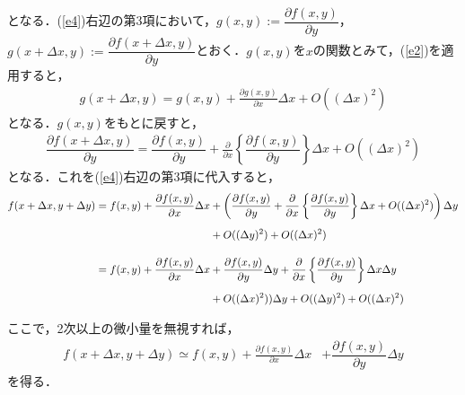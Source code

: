 \documentclass[12pt]{jsarticle}\usepackage{ifthen}\newboolean{enlarge}\setboolean{enlarge}{false}
\begin{document}
となる．(\ref{e4})右辺の第3項において，$g(x,y):=\dfrac{\partial f(x,y)}{\partial y}$，$g(x+\Delta x,y):=\dfrac{\partial f(x+\Delta x,y)}{\partial y}$とおく．$g(x,y)$を$x$の関数とみて，(\ref{e2})を適用すると，
\begin{align}
\label{e5}
g(x+\Delta x,y)=g(x,y)+\frac{\partial g(x,y)}{\partial x}\Delta x+O((\Delta x)^2)
\end{align}
となる．$g(x,y)$をもとに戻すと，
\begin{align}
\label{e6}
\dfrac{\partial f(x+\Delta x,y)}{\partial y}=\dfrac{\partial f(x,y)}{\partial y}+\frac{\partial }{\partial x}
\left\{
\dfrac{\partial f(x,y)}{\partial y}
\right\}
\Delta x+O((\Delta x)^2)
\end{align}
となる．これを(\ref{e4})右辺の第3項に代入すると，
\begin{align}\label{e7}
f(x+\Delta x,y+\Delta y)
=f(x,y)+\frac{\partial f(x,y)}{\partial x}\Delta x&+
\left(\dfrac{\partial f(x,y)}{\partial y}+\frac{\partial }{\partial x}
\left\{
\dfrac{\partial f(x,y)}{\partial y}
\right\}
\Delta x+O((\Delta x)^2)\right)
\Delta y\notag\\[5pt]
&+O((\Delta y)^2)+O((\Delta x)^2)\notag\\[10pt]
%
=f(x,y)+\frac{\partial f(x,y)}{\partial x}\Delta x&+\dfrac{\partial f(x,y)}{\partial y}\Delta y+\frac{\partial }{\partial x}
\left\{
\dfrac{\partial f(x,y)}{\partial y}
\right\}\Delta x\Delta y\notag\\[5pt]
&
+O((\Delta x)^2))\Delta y+O((\Delta y)^2)+O((\Delta x)^2)\notag\\[5pt]
\end{align}
ここで，2次以上の微小量を無視すれば，
%
\begin{align}\label{e8}
f(x+\Delta x,y+\Delta y)
%
\simeq f(x,y)+\frac{\partial f(x,y)}{\partial x}\Delta x&+\dfrac{\partial f(x,y)}{\partial y}\Delta y
\end{align}
を得る．










\end{document}
